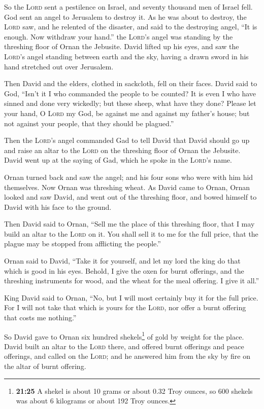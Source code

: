  So the \textsc{Lord} sent a pestilence on Israel, and
seventy thousand men of Israel fell.  God sent an angel
to Jerusalem to destroy it. As he was about to destroy, the
\textsc{Lord} saw, and he relented of the disaster, and said to the
destroying angel, ``It is enough. Now withdraw your hand.'' the
\textsc{Lord}'s angel was standing by the threshing floor of Ornan the
Jebusite.  David lifted up his eyes, and saw the
\textsc{Lord}'s angel standing between earth and the sky, having a drawn
sword in his hand stretched out over Jerusalem.

Then David and the elders, clothed in sackcloth, fell on their faces.
 David said to God, ``Isn't it I who commanded the people
to be counted? It is even I who have sinned and done very wickedly; but
these sheep, what have they done? Please let your hand, O \textsc{Lord}
my God, be against me and against my father's house; but not against
your people, that they should be plagued.''

 Then the \textsc{Lord}'s angel commanded Gad to tell
David that David should go up and raise an altar to the \textsc{Lord} on
the threshing floor of Ornan the Jebusite.  David went up
at the saying of Gad, which he spoke in the \textsc{Lord}'s name.

 Ornan turned back and saw the angel; and his four sons
who were with him hid themselves. Now Ornan was threshing wheat.
 As David came to Ornan, Ornan looked and saw David, and
went out of the threshing floor, and bowed himself to David with his
face to the ground.

 Then David said to Ornan, ``Sell me the place of this
threshing floor, that I may build an altar to the \textsc{Lord} on it.
You shall sell it to me for the full price, that the plague may be
stopped from afflicting the people.''

 Ornan said to David, ``Take it for yourself, and let my
lord the king do that which is good in his eyes. Behold, I give the oxen
for burnt offerings, and the threshing instruments for wood, and the
wheat for the meal offering. I give it all.''

 King David said to Ornan, ``No, but I will most
certainly buy it for the full price. For I will not take that which is
yours for the \textsc{Lord}, nor offer a burnt offering that costs me
nothing.''

 So David gave to Ornan six hundred shekels\footnote{\textbf{21:25}
  A shekel is about 10 grams or about 0.32 Troy ounces, so 600 shekels
  was about 6 kilograms or about 192 Troy ounces.} of gold by weight for
the place.  David built an altar to the \textsc{Lord}
there, and offered burnt offerings and peace offerings, and called on
the \textsc{Lord}; and he answered him from the sky by fire on the altar
of burnt offering.

